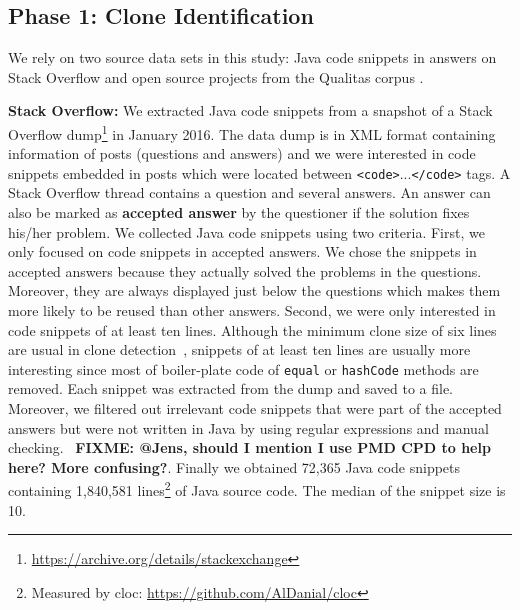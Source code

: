 \documentclass[10pt,journal,compsoc]{IEEEtran}
\newcommand\FIXME[1]{{\color{red}\textbf{FIXME: #1}}}
\begin{document}
\subsection{Phase 1: Clone Identification}

We rely on two source data sets in this study: Java code snippets in answers
on Stack Overflow and open source projects from the Qualitas corpus
\cite{QualitasCorpus}.

\textbf{Stack Overflow:} 
We extracted Java code snippets from a snapshot of a Stack Overflow
dump\footnote{\url{https://archive.org/details/stackexchange}} in January 2016.
The data dump is in XML format containing information of posts (questions and
answers) and we were interested in code snippets embedded in posts which were
located between {\small\texttt{<code>}...\texttt{</code>}} tags. A Stack
Overflow thread contains a question and several answers. An answer can also be
marked as \textbf{accepted answer} by the questioner if the solution fixes
his/her problem. We collected Java code snippets using two criteria. First, we
only focused on code snippets in accepted answers. We chose the snippets in
accepted answers because they actually solved the problems in the questions.
Moreover, they are always displayed just below the questions which makes them
more likely to be reused than other answers. Second, we were only interested in
code snippets of at least ten lines. Although the minimum clone size of six
lines are usual in clone detection~\cite{Bellon2007,Wang2013,Koschke2006},
snippets of at least ten lines are usually more interesting since most of
boiler-plate code of \texttt{equal} or \texttt{hashCode} methods are removed.
Each snippet was extracted from the dump and saved to a file. Moreover, we
filtered out irrelevant code snippets that were part of the accepted answers
but were not written in Java by using regular expressions and manual checking.
~\FIXME{@Jens, should I mention I use PMD CPD to help here? More confusing?}.
Finally we obtained
72,365 Java code snippets containing 1,840,581 lines\footnote{Measured by cloc:
	\url{https://github.com/AlDanial/cloc}} of Java source code. The median of the
snippet size is 10.
\end{document}
